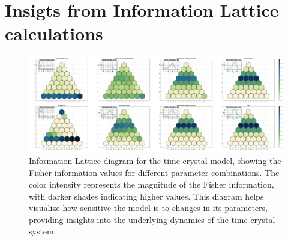 \section{Insigts from Information Lattice calculations}

\begin{figure}[h]
    \centering
    \includegraphics[width=\textwidth]{.src/images/info_lattice_diagram_timecrystals.png}
    \caption{Information Lattice diagram for the time-crystal model, showing the Fisher information values for different parameter combinations. The color intensity represents the magnitude of the Fisher information, with darker shades indicating higher values. This diagram helps visualize how sensitive the model is to changes in its parameters, providing insights into the underlying dynamics of the time-crystal system.}
    \label{fig:info_lattice_diagram_timecrystals}
\end{figure}